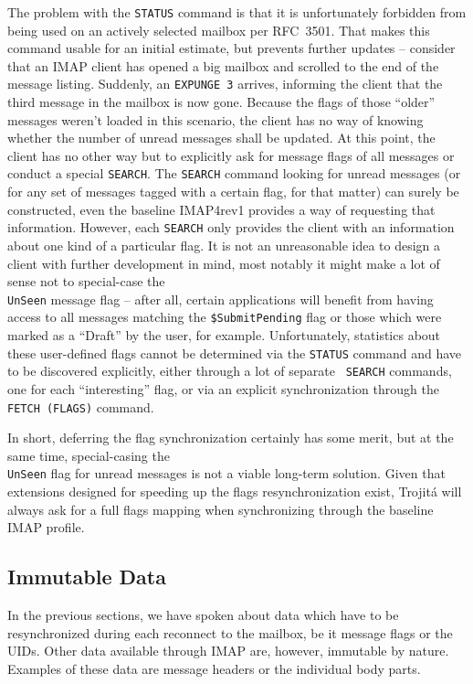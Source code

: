 \documentclass[trojita]{subfiles}
\begin{document}
The problem with the {\tt STATUS} command is that it is unfortunately forbidden from being used on an actively selected
mailbox per RFC~3501.  That makes this command usable for an initial estimate, but prevents further updates -- consider
that an IMAP client has opened a big mailbox and scrolled to the end of the message listing.  Suddenly, an {\tt *
EXPUNGE 3} arrives, informing the client that the third message in the mailbox is now gone.  Because the flags of those
``older'' messages weren't loaded in this scenario, the client has no way of knowing whether the number of unread
messages shall be updated.  At this point, the client has no other way but to explicitly ask for message flags of all
messages or conduct a special {\tt SEARCH}.  The {\tt SEARCH} command looking for unread messages (or for any set of
messages tagged with a certain flag, for that matter) can surely be constructed, even the baseline IMAP4rev1 provides a
way of requesting that information.  However, each {\tt SEARCH} only provides the client with an information about one
kind of a particular flag.  It is not an unreasonable idea to design a client with further development in mind, most
notably it might make a lot of sense not to special-case the {\tt \\UnSeen} message flag -- after all, certain
applications will benefit from having access to all messages matching the {\tt \$SubmitPending} flag or those which were
marked as a ``Draft'' by the user, for example.  Unfortunately, statistics about these user-defined flags cannot be
determined via the {\tt STATUS} command and have to be discovered explicitly, either through a lot of separate {\tt
SEARCH} commands, one for each ``interesting'' flag, or via an explicit synchronization through the {\tt FETCH (FLAGS)}
command.

In short, deferring the flag synchronization certainly has some merit, but at the same time, special-casing the {\tt
\\UnSeen} flag for unread messages is not a viable long-term solution.  Given that extensions designed for speeding up
the flags resynchronization exist, Trojitá will always ask for a full flags mapping when synchronizing through the
baseline IMAP profile.

\subsection{Immutable Data}
\label{sec:imap-immutable-data}

In the previous sections, we have spoken about data which have to be resynchronized during each reconnect to the
mailbox, be it message flags or the UIDs.  Other data available through IMAP are, however, immutable by nature.
Examples of these data are message headers or the individual body parts.
\end{document}
